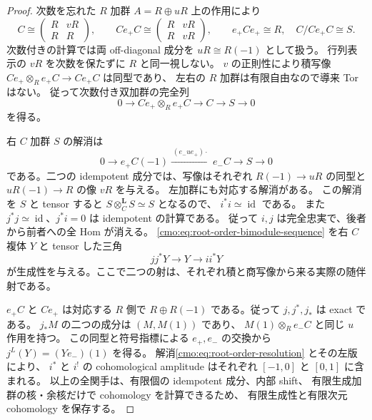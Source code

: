 \begin{proof}
次数を忘れた $R$ 加群 $A=R\oplus uR$ 上の作用により
\[
 C\cong\begin{pmatrix}R&vR\\R&R\end{pmatrix},\qquad
 Ce_+C\cong\begin{pmatrix}R&vR\\R&vR\end{pmatrix},
 \qquad e_+Ce_+\cong R,\quad C/Ce_+C\cong S.
\]
次数付きの計算では両 off-diagonal 成分を $uR\cong R(-1)$ として扱う。
行列表示の $vR$ を次数を保たずに $R$ と同一視しない。
$v$ の正則性により積写像
$Ce_+\otimes_R e_+C\to Ce_+C$ は同型であり、
左右の $R$ 加群は有限自由なので導来 Tor はない。
従って次数付き双加群の完全列
\begin{equation}
\label{cmo:eq:root-order-bimodule-sequence}
 0\longrightarrow Ce_+\otimes_R e_+C
  \longrightarrow C\longrightarrow S\longrightarrow0
\end{equation}
を得る。

右 $C$ 加群 $S$ の解消は
\begin{equation}
\label{cmo:eq:root-order-resolution}
 0\longrightarrow e_+C(-1)
  \xrightarrow{\ (e_-ue_+)\cdot\ }e_-C
  \longrightarrow S\longrightarrow0
\end{equation}
である。二つの idempotent 成分では、写像はそれぞれ
$R(-1)\to uR$ の同型と $uR(-1)\to R$ の像 $vR$ を与える。
左加群にも対応する解消がある。
この解消を $S$ と tensor すると $S\otimes_C^{\mathbf L}S\simeq S$ となるので、
$i^*i\simeq\operatorname{id}$ である。
また $j^*j\simeq\operatorname{id}$、$j^*i=0$ は idempotent の計算である。
従って $i,j$ は完全忠実で、後者から前者への全 Hom が消える。
\eqref{cmo:eq:root-order-bimodule-sequence} を右 $C$ 複体 $Y$ と tensor した三角
\begin{equation}
\label{cmo:eq:root-order-projection-triangle}
 j j^*Y\longrightarrow Y\longrightarrow i i^*Y
\end{equation}
が生成性を与える。ここで二つの射は、それぞれ積と商写像から来る実際の随伴射である。

$e_+C$ と $Ce_+$ は対応する $R$ 側で
$R\oplus R(-1)$ である。従って $j,j^*,j_*$ は exact である。
$j_*M$ の二つの成分は $(M,M(1))$ であり、
$M(1)\otimes_R e_-C$ と同じ $u$ 作用を持つ。
この同型と符号指標による $e_+,e_-$ の交換から
$j^L(Y)=(Ye_-)(1)$ を得る。
解消\eqref{cmo:eq:root-order-resolution} とその左版により、
$i^*$ と $i^!$ の cohomological amplitude はそれぞれ
$[-1,0]$ と $[0,1]$ に含まれる。
以上の全関手は、有限個の idempotent 成分、内部 shift、
有限生成加群の核・余核だけで cohomology を計算できるため、
有限生成性と有限次元 cohomology を保存する。


\end{proof}
